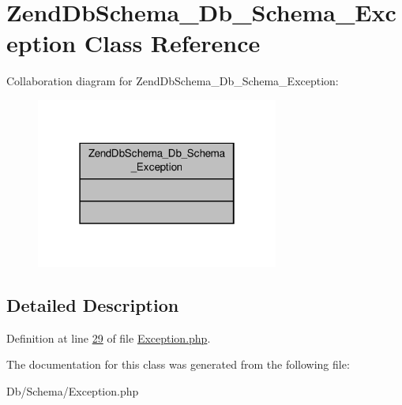 \hypertarget{classZendDbSchema__Db__Schema__Exception}{\section{Zend\-Db\-Schema\-\_\-\-Db\-\_\-\-Schema\-\_\-\-Exception Class Reference}
\label{classZendDbSchema__Db__Schema__Exception}
}


Collaboration diagram for Zend\-Db\-Schema\-\_\-\-Db\-\_\-\-Schema\-\_\-\-Exception\-:\nopagebreak
\begin{figure}[H]
\begin{center}
\leavevmode
\includegraphics[width=226pt]{classZendDbSchema__Db__Schema__Exception__coll__graph}
\end{center}
\end{figure}


\subsection{Detailed Description}


Definition at line \hyperlink{Schema_2Exception_8php_source_l00029}{29} of file \hyperlink{Schema_2Exception_8php_source}{Exception.\-php}.



The documentation for this class was generated from the following file\-:\begin{DoxyCompactItemize}
\item 
Db/\-Schema/Exception.\-php\end{DoxyCompactItemize}
